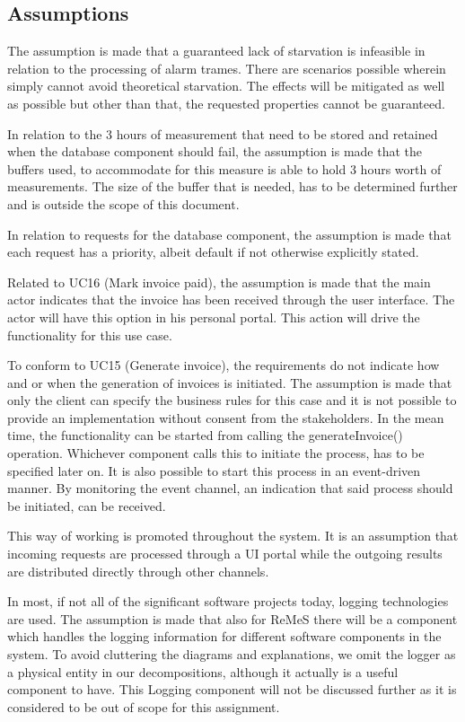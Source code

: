 \subsection{Assumptions}
\label{sec:ADDAssumptions} 
The assumption is made that a guaranteed lack of starvation is infeasible in relation 
to the processing of alarm trames. There are scenarios possible wherein simply cannot avoid theoretical starvation. The effects will be mitigated as well as possible but other than that, the requested properties cannot be guaranteed.

In relation to the 3 hours of measurement that need to be stored and retained when the database component should fail, the assumption is made that the buffers used, to accommodate for this measure
is able to hold 3 hours worth of measurements. The size of the buffer that is needed, has to be determined further and is outside the scope of this document.

In relation to requests for the database component, the assumption is made that each request has a priority, albeit default if not otherwise explicitly stated. 

Related to UC16 (Mark invoice paid), the assumption is made that the main actor indicates that the invoice has been received through the user interface.
The actor will have this option in his personal portal. This action will drive the functionality for this use case.

To conform to UC15 (Generate invoice), the requirements do not indicate how and or when the generation of invoices is initiated.
The assumption is made that only the client can specify the business rules for this case and it is not possible to provide an implementation without consent
from the stakeholders. In the mean time, the functionality can be started from calling the generateInvoice() operation. Whichever component calls this to initiate the process,
has to be specified later on. It is also possible to start this process in an event-driven manner. By monitoring the event channel, an indication that said process
should be initiated, can be received.

This way of working is promoted throughout the system. It is an assumption that incoming requests are processed through a UI portal while the outgoing results are distributed directly through other channels.

In most, if not all of the significant software projects today, logging technologies are used. The assumption is made that also for ReMeS there will be a component which handles the logging information for different software components in the system.
To avoid cluttering the diagrams and explanations, we omit the logger as a physical entity in our decompositions, although it actually is a useful component to have. This Logging component will not be discussed further as it is considered to be out of scope for this assignment. 


